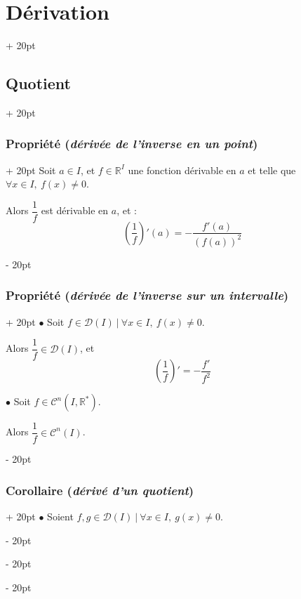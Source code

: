 \documentclass[a4paper, 12pt, twoside]{article}
\newcommand{\R}{\mathbb{R}} %
\newcommand{\lr}[1]{\left( #1 \right)}
\newcommand{\ind}[1][20pt]{\advance\leftskip + #1}
\newcommand{\deind}[1][20pt]{\advance\leftskip - #1}
\newenvironment{indt}[2][20pt]{#2 \par \ind[#1]}{\par \deind} %
\begin{document}
\begin{indt}{\section{Dérivation}}
        \vspace{12pt}
        
        \begin{indt}{\subsection{Quotient}}
            \begin{indt}{\subsubsection{Propriété (\textit{dérivée de l'inverse en un point})}}
                Soit $a \in I$, et $f \in \R^I$ une fonction dérivable en $a$ et telle que $\forall x \in I,\ f(x) \neq 0$.

                Alors $\dfrac 1 f$ est dérivable en $a$, et :
                \[
                    \lr{\dfrac 1 f}'(a) = -\dfrac{f'(a)}{\lr{f(a)}^2}
                \]
            \end{indt}

            \vspace{12pt}
            
            \begin{indt}{\subsubsection{Propriété (\textit{dérivée de l'inverse sur un intervalle})}}
                $\bullet$ Soit $f \in \mathcal D(I)\ |\ \forall x \in I,\ f(x) \neq 0$.

                Alors $\dfrac 1 f \in \mathcal D(I)$, et
                \[
                    \lr{\dfrac 1 f}' = - \dfrac{f'}{f^2}
                \]

                \vspace{6pt}
                
                $\bullet$ Soit $f \in \mathcal C^n(I, \R^*)$.

                Alors $\dfrac 1 f \in \mathcal C^n(I)$.
            \end{indt}

            \vspace{12pt}
            
            \begin{indt}{\subsubsection{Corollaire (\textit{dérivé d'un quotient})}}
                $\bullet$ Soient $f, g \in \mathcal D(I)\ |\ \forall x \in I,\ g(x) \neq 0$.


\end{indt}
\end{indt}
\end{indt}
\end{document}

